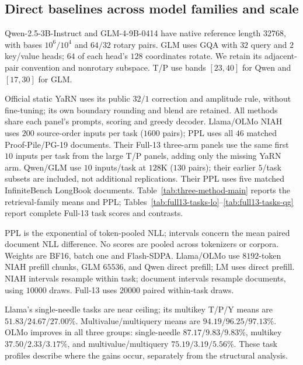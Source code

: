\subsection{Direct baselines across model families and scale}
\label{sec:three-method-complete}
Qwen-2.5-3B-Instruct \citep{qwen2024qwen25} and GLM-4-9B-0414 have native
reference length $32768$, with bases $10^6/10^4$ and $64/32$ rotary pairs.
GLM uses GQA with $32$ query and $2$ key/value heads; $64$ of each head's
$128$ coordinates rotate. We retain its adjacent-pair convention and
nonrotary subspace. T/P use bands $[23,40]$ for Qwen and $[17,30]$ for GLM.

Official static YaRN uses its public $32/1$ correction and amplitude rule,
without fine-tuning; its own boundary rounding and blend are retained.
All methods share each panel's prompts, scoring and greedy decoder.
Llama/OLMo NIAH uses $200$ source-order inputs per task ($1600$ pairs);
PPL uses all $46$ matched Proof-Pile/PG-19 documents. Their Full-13 three-arm
panels use the same first $10$ inputs per task from the large T/P panels,
adding only the missing YaRN arm. Qwen/GLM use $10$ inputs/task at $128$K
($130$ pairs); their earlier $5$/task subsets are included, not additional
replications. Their PPL uses five matched InfiniteBench LongBook documents.
Table~\ref{tab:three-method-main} reports the retrieval-family means and PPL;
Tables~\ref{tab:full13-tasks-lo}--\ref{tab:full13-tasks-qg} report complete
Full-13 task scores and contrasts.

PPL is the exponential of token-pooled NLL; intervals concern the mean paired
document NLL difference. No scores are pooled across tokenizers or corpora.
Weights are BF16, batch one and Flash-SDPA. Llama/OLMo use $8192$-token NIAH
prefill chunks, GLM $65536$, and Qwen direct prefill; LM uses direct prefill.
NIAH intervals resample within task; document intervals resample documents,
using $10000$ draws. Full-13 uses $20000$ paired within-task draws.


Llama's single-needle tasks are near ceiling; its multikey T/P/Y means are
$51.83/24.67/27.00\%$. Multivalue/multiquery means are
$94.19/96.25/97.13\%$. OLMo improves in all three groups: single-needle
$87.17/9.83/9.83\%$, multikey $37.50/2.33/3.17\%$, and
multivalue/multiquery $75.19/3.19/5.56\%$. These task profiles describe where
the gains occur, separately from the structural analysis.



